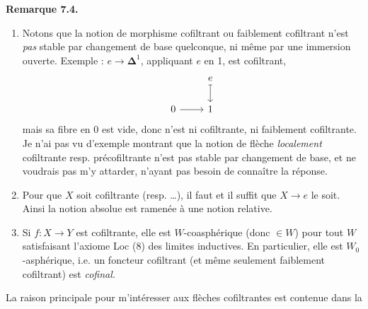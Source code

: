 \documentclass[11pt]{article}
\newcommand{\printedpage}[1]{\marginpar{\footnotesize p.~#1}}
\def\dcprintedpending{}
\newcommand{\msp}[1]{\marginpar{\footnotesize\raggedright
  \ifx\dcprintedpending\empty\else p.~\dcprintedpending\par\fi
  [#1]}\gdef\dcprintedpending{}}
\begin{document}
\printedpage{57}
\textbf{Remarque 7.4.}
\begin{enumerate}
\item[1)] Notons que la notion de morphisme cofiltrant ou faiblement cofiltrant n'est \textit{pas} stable par changement de base quelconque, ni même par une immersion ouverte. Exemple : $e \longrightarrow \boldsymbol{\Delta}^1$, appliquant $e$ en 1, est cofiltrant,
\[
\begin{tikzcd}
 & e \arrow[d, mapsto] \\
0 \arrow[r] & 1
\end{tikzcd}
\]
mais sa fibre en 0 est vide, donc n'est ni cofiltrante, ni faiblement cofiltrante. Je n'ai pas vu d'exemple montrant que la notion de flèche \textit{localement} cofiltrante resp. précofiltrante n'est pas stable par changement de base, et ne voudrais pas m'y attarder, n'ayant pas besoin de connaître la réponse.
\item[2)] Pour que $X$ soit cofiltrante (resp. \dots), il faut et il suffit que $X \longrightarrow e$ le soit. Ainsi la notion absolue est ramenée à une notion relative.
\item[3)] Si $f : X \longrightarrow Y$ est cofiltrante, elle est \msp{page 92} $W$-coasphérique (donc $\in W$) pour tout $W$ satisfaisant l'axiome Loc (8) des limites inductives. En particulier, elle est $W_0$-asphérique, i.e. un foncteur cofiltrant (et même seulement faiblement cofiltrant) est \textit{cofinal.}
\end{enumerate}
La raison principale pour m'intéresser aux flèches cofiltrantes est contenue dans la
\end{document}
